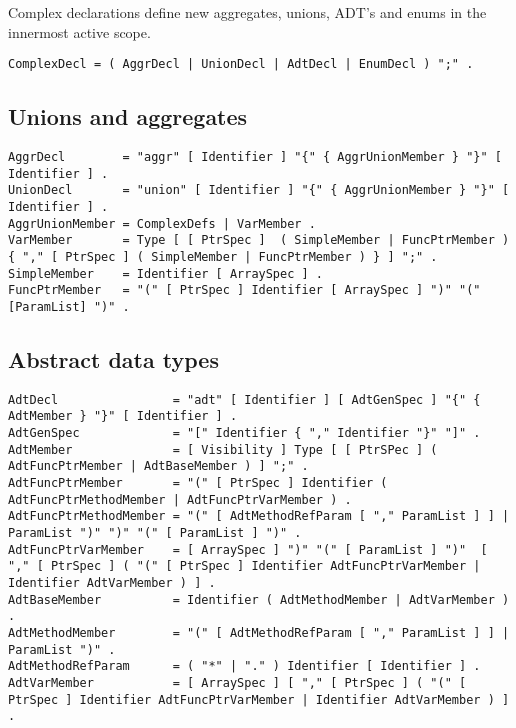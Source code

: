 Complex declarations define new aggregates, unions, ADT's and enums in
the innermost active scope.

\begin{lstlisting}
ComplexDecl = ( AggrDecl | UnionDecl | AdtDecl | EnumDecl ) ";" .
\end{lstlisting}

\hypertarget{unions-and-aggregates}{%
\subsection{Unions and aggregates}\label{unions-and-aggregates}}

\begin{lstlisting}
AggrDecl        = "aggr" [ Identifier ] "{" { AggrUnionMember } "}" [ Identifier ] .
UnionDecl       = "union" [ Identifier ] "{" { AggrUnionMember } "}" [ Identifier ] .
AggrUnionMember = ComplexDefs | VarMember .
VarMember       = Type [ [ PtrSpec ]  ( SimpleMember | FuncPtrMember ) { "," [ PtrSpec ] ( SimpleMember | FuncPtrMember ) } ] ";" .
SimpleMember    = Identifier [ ArraySpec ] .
FuncPtrMember   = "(" [ PtrSpec ] Identifier [ ArraySpec ] ")" "(" [ParamList] ")" .
\end{lstlisting}

\hypertarget{abstract-data-types-1}{%
\subsection{Abstract data types}\label{abstract-data-types-1}}

\begin{lstlisting}
AdtDecl                = "adt" [ Identifier ] [ AdtGenSpec ] "{" { AdtMember } "}" [ Identifier ] .
AdtGenSpec             = "[" Identifier { "," Identifier "}" "]" .
AdtMember              = [ Visibility ] Type [ [ PtrSPec ] ( AdtFuncPtrMember | AdtBaseMember ) ] ";" .
AdtFuncPtrMember       = "(" [ PtrSpec ] Identifier ( AdtFuncPtrMethodMember | AdtFuncPtrVarMember ) .
AdtFuncPtrMethodMember = "(" [ AdtMethodRefParam [ "," ParamList ] ] | ParamList ")" ")" "(" [ ParamList ] ")" .
AdtFuncPtrVarMember    = [ ArraySpec ] ")" "(" [ ParamList ] ")"  [ "," [ PtrSpec ] ( "(" [ PtrSpec ] Identifier AdtFuncPtrVarMember | Identifier AdtVarMember ) ] .
AdtBaseMember          = Identifier ( AdtMethodMember | AdtVarMember ) .
AdtMethodMember        = "(" [ AdtMethodRefParam [ "," ParamList ] ] | ParamList ")" .
AdtMethodRefParam      = ( "*" | "." ) Identifier [ Identifier ] .
AdtVarMember           = [ ArraySpec ] [ "," [ PtrSpec ] ( "(" [ PtrSpec ] Identifier AdtFuncPtrVarMember | Identifier AdtVarMember ) ] .
\end{lstlisting}

